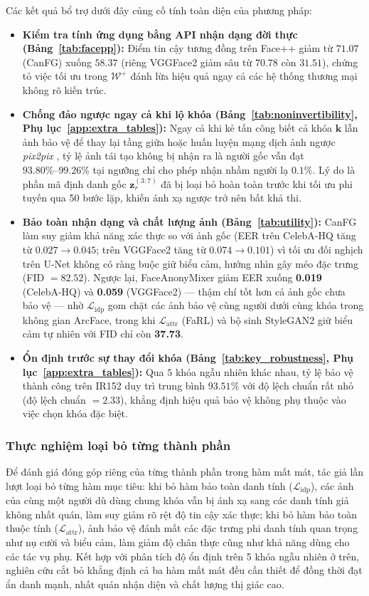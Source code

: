 \documentclass[oneside,a4paper,12pt]{extarticle}
\begin{document}
Các kết quả bổ trợ dưới đây củng cố tính toàn diện của phương pháp:
\begin{itemize}
    \item \textbf{Kiểm tra tính ứng dụng bằng API nhận dạng đời thực (Bảng~\ref{tab:facepp}):} Điểm tin cậy tương đồng trên Face++ giảm từ $71.07$ (CanFG) xuống $58.37$ (riêng VGGFace2 giảm sâu từ $70.78$ còn $31.51$), chứng tỏ việc tối ưu trong $\mathcal{W}^+$ đánh lừa hiệu quả ngay cả các hệ thống thương mại không rõ kiến trúc.
    \item \textbf{Chống đảo ngược ngay cả khi lộ khóa (Bảng~\ref{tab:noninvertibility}, Phụ lục~\ref{app:extra_tables}):} Ngay cả khi kẻ tấn công biết cả khóa $\mathbf{k}$ lẫn ảnh bảo vệ để thay lại tầng giữa hoặc huấn luyện mạng dịch ảnh ngược \textit{pix2pix} \cite{isola2017pix2pix}, tỷ lệ ảnh tái tạo không bị nhận ra là người gốc vẫn đạt $93.80\%\text{--}99.26\%$ tại ngưỡng chỉ cho phép nhận nhầm người lạ $0.1\%$. Lý do là phần mã định danh gốc $\mathbf{z}_r^{(3:7)}$ đã bị loại bỏ hoàn toàn trước khi tối ưu phi tuyến qua 50 bước lặp, khiến ánh xạ ngược trở nên bất khả thi.
    \item \textbf{Bảo toàn nhận dạng và chất lượng ảnh (Bảng~\ref{tab:utility}):} CanFG làm suy giảm khả năng xác thực so với ảnh gốc (EER trên CelebA-HQ tăng từ $0.027 \rightarrow 0.045$; trên VGGFace2 tăng từ $0.074 \rightarrow 0.101$) vì tối ưu đối nghịch trên U-Net không có ràng buộc giữ biểu cảm, hướng nhìn gây méo đặc trưng (FID \cite{heusel2017fid} $= 82.52$). Ngược lại, FaceAnonyMixer giảm EER xuống \textbf{0.019} (CelebA-HQ) và \textbf{0.059} (VGGFace2) --- thậm chí tốt hơn cả ảnh gốc chưa bảo vệ --- nhờ $\mathcal{L}_{\text{idp}}$ gom chặt các ảnh bảo vệ cùng người dưới cùng khóa trong không gian ArcFace, trong khi $\mathcal{L}_{\text{attr}}$ (FaRL) và bộ sinh StyleGAN2 giữ biểu cảm tự nhiên với FID chỉ còn \textbf{37.73}.
    \item \textbf{Ổn định trước sự thay đổi khóa (Bảng~\ref{tab:key_robustness}, Phụ lục~\ref{app:extra_tables}):} Qua $5$ khóa ngẫu nhiên khác nhau, tỷ lệ bảo vệ thành công trên IR152 duy trì trung bình $93.51\%$ với độ lệch chuẩn rất nhỏ (độ lệch chuẩn $= 2.33$), khẳng định hiệu quả bảo vệ không phụ thuộc vào việc chọn khóa đặc biệt.
\end{itemize}

\subsubsection*{Thực nghiệm loại bỏ từng thành phần}
Để đánh giá đóng góp riêng của từng thành phần trong hàm mất mát, tác giả lần lượt loại bỏ từng hàm mục tiêu: khi bỏ hàm bảo toàn danh tính ($\mathcal{L}_{\text{idp}}$), các ảnh của cùng một người dù dùng chung khóa vẫn bị ánh xạ sang các danh tính giả không nhất quán, làm suy giảm rõ rệt độ tin cậy xác thực; khi bỏ hàm bảo toàn thuộc tính ($\mathcal{L}_{\text{attr}}$), ảnh bảo vệ đánh mất các đặc trưng phi danh tính quan trọng như nụ cười và biểu cảm, làm giảm độ chân thực cũng như khả năng dùng cho các tác vụ phụ. Kết hợp với phân tích độ ổn định trên 5 khóa ngẫu nhiên ở trên, nghiên cứu cắt bỏ khẳng định cả ba hàm mất mát đều cần thiết để đồng thời đạt ẩn danh mạnh, nhất quán nhận diện và chất lượng thị giác cao.
\end{document}
